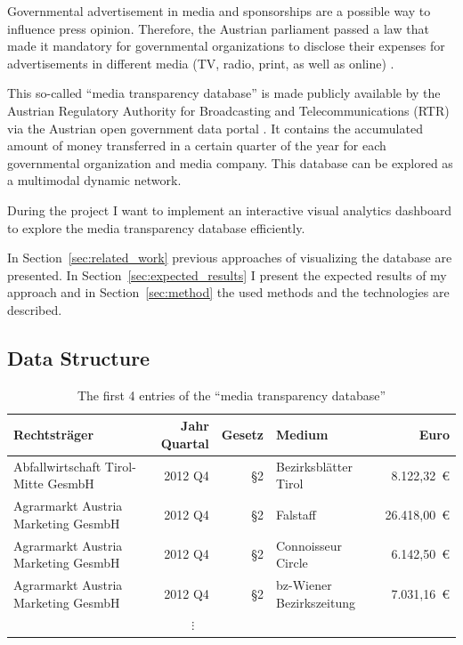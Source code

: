 \documentclass{acmsiggraph}               %
\begin{document}
Governmental advertisement in media and sponsorships are a possible way to influence press opinion. Therefore, the Austrian parliament passed a law that made it mandatory for governmental organizations to disclose their expenses for advertisements in different media (TV, radio, print, as well as online) \cite{Gesetz}.
\par
This so-called ``media transparency database'' is made publicly available by the Austrian Regulatory Authority for Broadcasting and Telecommunications (RTR) via the Austrian open government data portal \cite{RTR}.
It contains the accumulated amount of money transferred in a certain quarter of the year for each governmental organization and media company. This database can be explored as a multimodal dynamic network.
\par
During the project I want to implement an interactive visual analytics dashboard to explore the media transparency database efficiently. 
\par
In Section~\ref{sec:related_work} previous approaches of visualizing the database are presented. In Section~\ref{sec:expected_results} I present the expected results of my approach and in Section~\ref{sec:method} the used methods and the technologies are described.

\subsection{Data Structure} %
\label{sub:data_description}

\begin{table}[!htb]
  \begin{center}
    \begin{tabular}{lrrlr}
    \toprule
    Rechtstr{\"a}ger&Jahr Quartal&Gesetz&Medium&Euro\\
    \midrule
    Abfallwirtschaft Tirol-Mitte GesmbH&2012 Q4&§2&Bezirksblätter Tirol &8.122,32~\euro\\
    Agrarmarkt Austria Marketing GesmbH&2012 Q4&§2&Falstaff&26.418,00~\euro\\
    Agrarmarkt Austria Marketing GesmbH&2012 Q4&§2&Connoisseur Circle&6.142,50~\euro\\
    Agrarmarkt Austria Marketing GesmbH&2012 Q4&§2&bz-Wiener Bezirkszeitung&7.031,16~\euro\\
    \multicolumn{4}{c}{$\vdots$}
    \end{tabular}
  \end{center}
  \caption{The first 4 entries of the ``media transparency database''}
  \label{tab:data}
\end{table}
\end{document}
